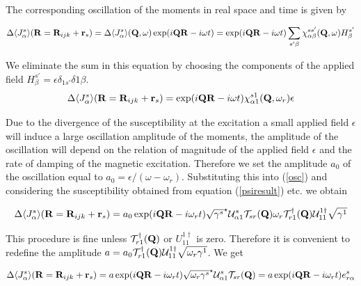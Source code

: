 The corresponding oscillation of the moments in real space and time is given by 

\begin{equation}
\Delta \langle J^s_{\alpha}\rangle(\mathbf R=\mathbf R_{ijk}+\mathbf r_s)=
\Delta \langle J^s_{\alpha}\rangle(\mathbf Q,\omega)\exp(i\mathbf Q \mathbf R-i\omega t)=
\exp(i\mathbf Q \mathbf R-i\omega t) \sum_{s'\beta}\chi^{ss'}_{\alpha\beta}(\mathbf Q,\omega) H^{s'}_{\beta}
\end{equation} 

We eliminate the sum in this equation by choosing the components of the applied field $H^{s'}_{\beta}=\epsilon %
\delta_{1s'}\delta{1\beta}$.
\begin{equation}\label{osc}
\Delta \langle J^s_{\alpha}\rangle(\mathbf R=\mathbf R_{ijk}+\mathbf r_s)=
\exp(i\mathbf Q \mathbf R-i\omega t) \chi^{s1}_{\alpha1}(\mathbf Q,\omega_r) \epsilon 
\end{equation} 

Due to the divergence of the susceptibility at the excitation  a small
applied field $\epsilon$ will induce a large oscillation amplitude of the moments, the amplitude
of the oscillation will depend on the relation of magnitude of the applied field $\epsilon$ and
the rate of damping of the magnetic excitation. Therefore we set the amplitude $a_0$ of the 
oscillation equal to $a_0=\epsilon / (\omega-\omega_r)$. Substituting this into (\ref{osc}) and
considering the susceptibility obtained from equation (\ref{psiresult}) etc. we obtain

\begin{equation}\label{oscill}
\Delta \langle J^s_{\alpha}\rangle(\mbf R=\mbf R_{ijk}+\mbf r_s)=
a_0 \exp(i\mbf Q \mbf R-i\omega_r t) 
\sqrt{\gamma^s}^\star \mathcal U^s_{\alpha1} \mathcal T_{sr}(\mbf Q) \omega_r \mathcal T^{\dag}_{r1}(\mbf Q) \mathcal %
U^{1\dag}_{11}\sqrt{\gamma^{1}}
\end{equation} 

This procedure is fine unless $\mathcal T^{\dag}_{r1}(\mathbf Q)$ or $U^{1\dag}_{11}$ is zero. Therefore
it is convenient to redefine the amplitude $a=a_0 \mathcal T^{\dag}_{r1}(\mbf Q) \mathcal %
U^{1\dag}_{11}\sqrt{\omega_r\gamma^{1}}$.
We get

\begin{equation}\label{oscillation}
\Delta \langle J^s_{\alpha}\rangle(\mathbf R=\mathbf R_{ijk}+\mathbf r_s)=
a \exp(i\mathbf Q \mathbf R-i\omega_r t) 
\sqrt{\omega_r\gamma^s}^\star \mathcal U^s_{\alpha1} \mathcal T_{sr}(\mathbf Q)=
a \exp(i\mathbf Q \mathbf R-i\omega_r t) e^s_{r\alpha} 
\end{equation} 

